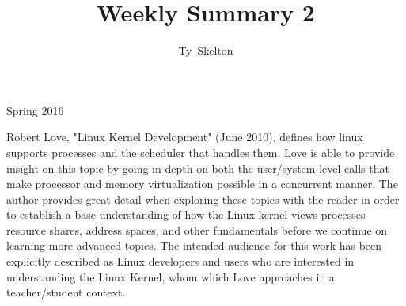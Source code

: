 \documentclass[10pt,draftclsnofoot,onecolumn]{IEEEtran}
\begin{document}
\singlespacing
\title{Weekly Summary 2}

\author{Ty~Skelton}


%
{Spring 2016}

\maketitle
\IEEEpeerreviewmaketitle

Robert Love, "Linux Kernel Development" (June 2010), defines how linux supports processes and the scheduler that handles them.
Love is able to provide insight on this topic by going in-depth on both the user/system-level calls that make processor and memory virtualization possible in a concurrent manner.
The author provides great detail when exploring these topics with the reader in order to establish a base understanding of how the Linux kernel views processes resource shares, address spaces, and other fundamentals before we continue on learning more advanced topics.
The intended audience for this work has been explicitly described as Linux developers and users who are interested in understanding the Linux Kernel, whom which Love approaches in a teacher/student context.
\end{document}
